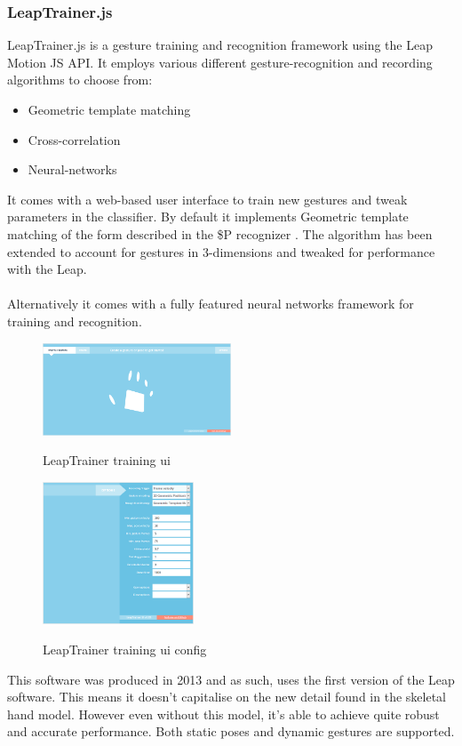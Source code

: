 \documentclass[a4paper]{article}
\begin{document}
\subsubsection{LeapTrainer.js \label{LeapTrainer}}
LeapTrainer.js is a gesture training and recognition framework using the Leap Motion JS API.
It employs various different gesture-recognition and recording algorithms to choose from:
\begin{itemize}
\item Geometric template matching
\item Cross-correlation
\item Neural-networks
\end{itemize}

It comes with a web-based user interface to train new gestures and tweak parameters in the classifier. By default it implements Geometric template matching of the form described in the \$P recognizer \cite{P} . The algorithm has been extended to account for gestures in 3-dimensions and tweaked for performance with the Leap. \\ \\
Alternatively it comes with a fully featured neural networks framework for training and recognition.

\begin{figure}[!h]
\centerline{\includegraphics[width=0.5\textwidth]{leaptrainer-ui.png}}
\caption{LeapTrainer training ui}\cite{LeapTrainer}
\end{figure}

\begin{figure}[!h]
\centerline{\includegraphics[width=0.4\textwidth]{training-ui-config.png}}
\caption{LeapTrainer training ui config}\cite{LeapTrainer}
\end{figure}
 This software was produced in 2013 and as such, uses the first version of the Leap software. This means it doesn't capitalise on the new detail found in the skeletal hand model. However even without this model, it's able to achieve quite robust and accurate performance. Both static poses and dynamic gestures are supported.\newpage
\end{document}

